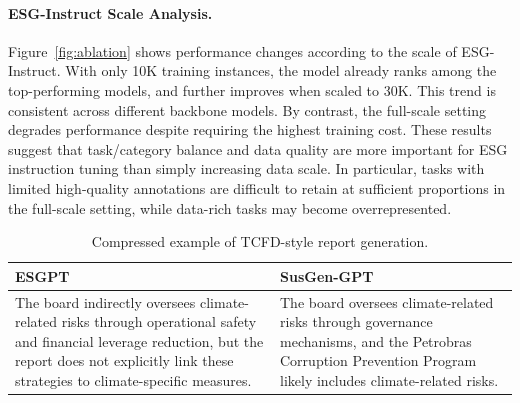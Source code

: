 \documentclass[11pt]{article}
\begin{document}

\paragraph{\textsf{ESG-Instruct} Scale Analysis.}
Figure~\ref{fig:ablation} shows performance changes according to the scale of \textsf{ESG-Instruct}. With only 10K training instances, the model already ranks among the top-performing models, and further improves when scaled to 30K. This trend is consistent across different backbone models. By contrast, the full-scale setting degrades performance despite requiring the highest training cost. These results suggest that task/category balance and data quality are more important for ESG instruction tuning than simply increasing data scale. In particular, tasks with limited high-quality annotations are difficult to retain at sufficient proportions in the full-scale setting, while data-rich tasks may become overrepresented.

\begin{table}[t]
\centering
\small
\setlength{\tabcolsep}{3pt}
\renewcommand{\arraystretch}{1.12}
\begin{tabularx}{\linewidth}{@{}XX@{}}
\hline
\textbf{\textsf{ESGPT}} & \textbf{SusGen-GPT} \\
\hline
The board indirectly oversees climate-related risks through operational safety and financial leverage reduction, but \textcolor{caseblue}{the report does not explicitly link these strategies to climate-specific measures}. 
&
The board oversees climate-related risks through governance mechanisms, and the Petrobras Corruption Prevention Program \textcolor{casered}{likely includes climate-related risks}. \\
\hline
\end{tabularx}
\caption{Compressed example of TCFD-style report generation.}
\label{tab:main_report_generation_case}
\end{table}
\end{document}
